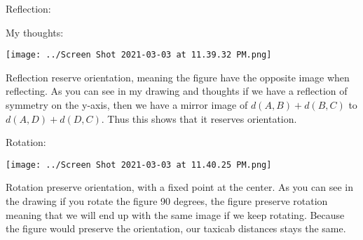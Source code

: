 \documentclass{article}
\begin{document}
Reflection: 

My thoughts:

\vspace{2mm}

\texttt{[image: ../Screen Shot 2021-03-03 at 11.39.32 PM.png]}

\vspace{2mm}

Reflection reserve orientation, meaning the figure have  the opposite image when reflecting. As you can see in my drawing and thoughts if we have a reflection of symmetry on the y-axis, then we have a mirror image of $d(A,B)+d(B,C)$ to $d(A,D)+d(D,C)$. Thus this shows that it reserves orientation. 


\vspace{2mm}


Rotation:

\vspace{2mm}

\texttt{[image: ../Screen Shot 2021-03-03 at 11.40.25 PM.png]}

\vspace{2mm}


Rotation preserve orientation, with a fixed point at the center. As you can see in the drawing if you rotate the figure 90 degrees, the figure preserve rotation meaning that we will end up with the same image if we keep rotating. Because the figure would preserve the orientation, our taxicab distances stays the same.
 
\end{document}
